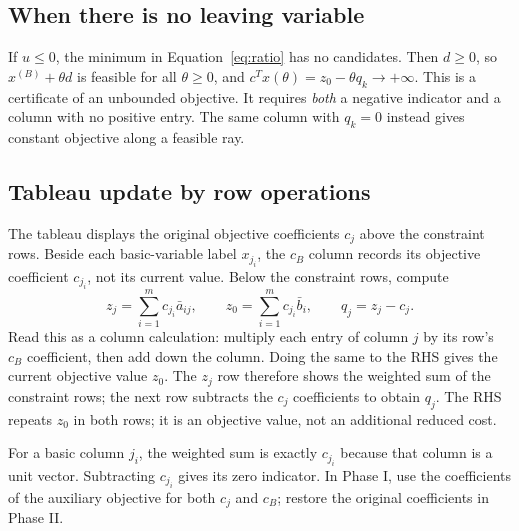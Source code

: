 \documentclass[11pt,a4paper]{article}
\begin{document}
\subsection{When there is no leaving variable}
If $u\leq0$, the minimum in Equation~\eqref{eq:ratio} has no candidates.
Then $d\geq0$, so $x^{(B)}+\theta d$ is feasible for all $\theta\geq0$, and
$c^Tx(\theta)=z_0-\theta q_k\to+\infty$. This is a certificate of an
unbounded objective. It requires \emph{both} a negative indicator and a
column with no positive entry. The same column with $q_k=0$ instead gives
constant objective along a feasible ray.

\subsection{Tableau update by row operations}\label{sec:row-operations}
The tableau displays the original objective coefficients $c_j$ above the
constraint rows. Beside each basic-variable label $x_{j_i}$, the $c_B$
column records its objective coefficient $c_{j_i}$, not its current value.
Below the constraint rows, compute
\[
  z_j=\sum_{i=1}^m c_{j_i}\bar a_{ij},\qquad
  z_0=\sum_{i=1}^m c_{j_i}\bar b_i,\qquad q_j=z_j-c_j.
\]
Read this as a column calculation: multiply each entry of column $j$ by
its row's $c_B$ coefficient, then add down the column. Doing the same to
the RHS gives the current objective value $z_0$. The $z_j$ row therefore
shows the weighted sum of the constraint rows; the next row subtracts the
$c_j$ coefficients to obtain $q_j$. The RHS repeats $z_0$ in both rows;
it is an objective value, not an additional reduced cost.

For a basic column $j_i$, the weighted sum is exactly $c_{j_i}$ because
that column is a unit vector. Subtracting $c_{j_i}$ gives its zero indicator.
In Phase I, use the coefficients of the auxiliary objective for both $c_j$
and $c_B$; restore the original coefficients in Phase II.
\end{document}
